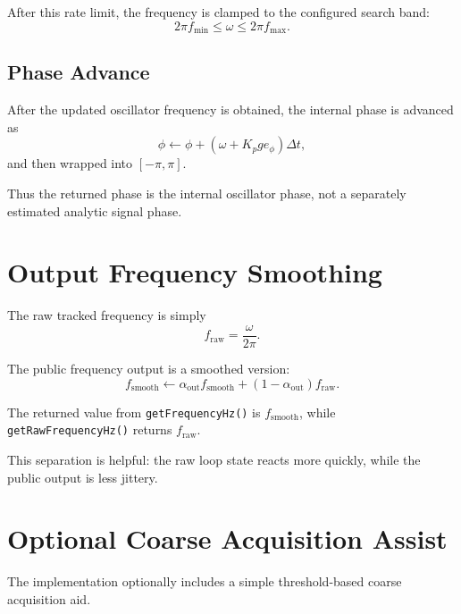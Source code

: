 \documentclass[conference]{IEEEtran}
\begin{document}
After this rate limit, the frequency is clamped to the configured search band:
\begin{equation}
  2\pi f_{\min} \le \omega \le 2\pi f_{\max}.
\end{equation}

\subsection{Phase Advance}

After the updated oscillator frequency is obtained, the internal phase is
advanced as
\begin{equation}
  \phi \leftarrow \phi + (\omega + K_p g e_\phi)\Delta t,
\end{equation}
and then wrapped into \([-\pi,\pi]\).

Thus the returned phase is the internal oscillator phase, not a separately
estimated analytic signal phase.

\section{Output Frequency Smoothing}

The raw tracked frequency is simply
\begin{equation}
  f_{\mathrm{raw}} = \frac{\omega}{2\pi}.
\end{equation}

The public frequency output is a smoothed version:
\begin{equation}
  f_{\mathrm{smooth}}
  \leftarrow
  \alpha_{\mathrm{out}} f_{\mathrm{smooth}}
  +
  (1-\alpha_{\mathrm{out}}) f_{\mathrm{raw}}.
\end{equation}

The returned value from \texttt{getFrequencyHz()} is \(f_{\mathrm{smooth}}\),
while \texttt{getRawFrequencyHz()} returns \(f_{\mathrm{raw}}\).

This separation is helpful: the raw loop state reacts more quickly, while the
public output is less jittery.

\section{Optional Coarse Acquisition Assist}\label{sec:coarse}

The implementation optionally includes a simple threshold-based coarse
acquisition aid.
\end{document}
